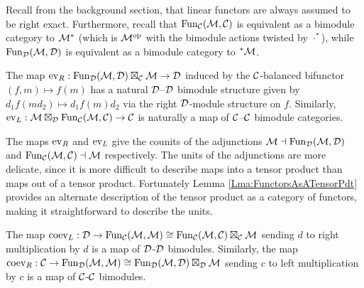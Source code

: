 \documentclass{amsart}
\begin{document}
Recall from the background section, that linear functors are always assumed to be right exact.  Furthermore, recall that $\operatorname{Fun}_{{\mathcal C}}(\mathcal M, \mathcal C)$ is equivalent as a bimodule category to $\mathcal M^*$ (which is $\mathcal M^{\mathrm{op}}$ with the bimodule actions twisted by $\cdot^*$), while $\operatorname{Fun}_{\mathcal D}(\mathcal M, \mathcal D)$ is equivalent as a bimodule category to ${}^*\mathcal M$.

\begin{lemma}
The map $\mathrm{ev}_R: \operatorname{Fun}_{{\mathcal D}}(\mathcal M, \mathcal D) \boxtimes_{\mathcal C} \mathcal M \rightarrow \mathcal D$ induced by the $\mathcal C$-balanced bifunctor $(f,m) \mapsto f(m)$ has a natural $\mathcal D$--$\mathcal D$ bimodule structure given by $d_1 f(m d_2)  \mapsto d_1 f(m) d_2$ via the right $\mathcal D$-module structure on $f$.  Similarly, $\mathrm{ev}_L: \mathcal M \boxtimes_{\mathcal D} \operatorname{Fun}_{\mathcal C}(\mathcal M, \mathcal C) \rightarrow \mathcal C$ is naturally a map of $\mathcal C$--$\mathcal C$ bimodule categories.
\end{lemma} 

The maps $\mathrm{ev}_R$ and $\mathrm{ev}_L$ give the counits of the adjunctions $\mathcal M \dashv \operatorname{Fun}_{{\mathcal D}}(\mathcal M, \mathcal D)$ and $\operatorname{Fun}_{\mathcal C}(\mathcal M,\mathcal C) \dashv \mathcal M$ respectively.  The units of the adjunctions are more delicate, since it is more difficult to describe maps into a tensor product than maps out of a tensor product. Fortunately Lemma \ref{Lma:FunctorsAsATensorPdt} provides an alternate description of the tensor product as a category of functors, making it straightforward  to describe the units.


\begin{lemma}
The map $\mathrm{coev}_L: \mathcal D \rightarrow \operatorname{Fun}_{\mathcal C}(\mathcal M,\mathcal M) \cong \operatorname{Fun}_{\mathcal C}(\mathcal M,\mathcal C) \boxtimes_\mathcal C \mathcal M$ sending $d$ to right multiplication by $d$ is a map of $\mathcal D$-$\mathcal D$ bimodules.  Similarly, the map $\mathrm{coev}_R: \mathcal C \rightarrow \operatorname{Fun}_{\mathcal D}(\mathcal M,\mathcal M) \cong \operatorname{Fun}_{\mathcal D}(\mathcal M,\mathcal D) \boxtimes_\mathcal D \mathcal M$ sending $c$ to left multiplication by $c$ is a map of $\mathcal C$-$\mathcal C$ bimodules.
\end{lemma}
\end{document}
